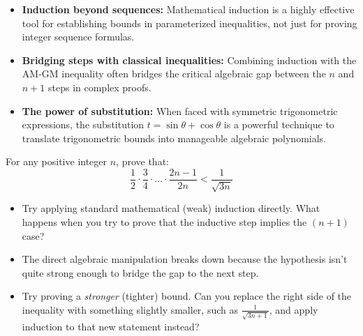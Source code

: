 \begin{takeaways}
\begin{itemize}[leftmargin=*]
    \item \textbf{Induction beyond sequences:} Mathematical induction is a highly effective tool for establishing bounds in parameterized inequalities, not just for proving integer sequence formulas.
    \item \textbf{Bridging steps with classical inequalities:} Combining induction with the AM-GM inequality often bridges the critical algebraic gap between the $n$ and $n+1$ steps in complex proofs.
    \item \textbf{The power of substitution:} When faced with symmetric trigonometric expressions, the substitution $t = \sin\theta + \cos\theta$ is a powerful technique to translate trigonometric bounds into manageable algebraic polynomials.
\end{itemize}
\end{takeaways}

\begin{problem}
For any positive integer $n$, prove that:
\[
\frac{1}{2} \cdot \frac{3}{4} \cdot \dots \cdot \frac{2n-1}{2n} < \frac{1}{\sqrt{3n}}
\]
\end{problem}

\begin{hint}
\begin{itemize}[leftmargin=*]
    \item Try applying standard mathematical (weak) induction directly. What happens when you try to prove that the inductive step implies the $(n+1)$ case?
    \item The direct algebraic manipulation breaks down because the hypothesis isn't quite strong enough to bridge the gap to the next step.
    \item Try proving a \textit{stronger} (tighter) bound. Can you replace the right side of the inequality with something slightly smaller, such as $\frac{1}{\sqrt{3n+1}}$, and apply induction to that new statement instead?
\end{itemize}
\end{hint}

